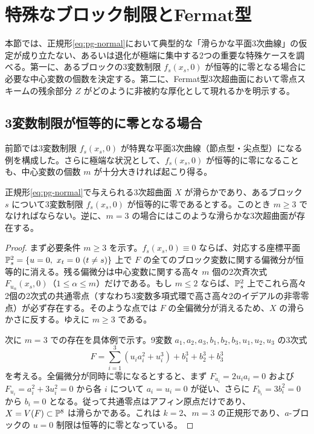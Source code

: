 \section{特殊なブロック制限とFermat型}\label{sec:pg-special}

本節では、正規形\eqref{eq:pg-normal}において典型的な「滑らかな平面3次曲線」の仮定が成り立たない、あるいは退化が極端に集中する2つの重要な特殊ケースを調べる。第一に、あるブロックの3変数制限 $f_s(x_s,0)$ が恒等的に零となる場合に必要な中心変数の個数を決定する。第二に、Fermat型3次超曲面において零点スキームの残余部分 $Z$ がどのように非被約な厚化として現れるかを明示する。

\subsection{3変数制限が恒等的に零となる場合}
前節では3変数制限 $f_s(x_s,0)$ が特異な平面3次曲線（節点型・尖点型）になる例を構成した。さらに極端な状況として、$f_s(x_s,0)$ が恒等的に零になることも、中心変数の個数 $m$ が十分大きければ起こり得る。

\begin{proposition}\label{prop:pg-zero-restriction}
正規形\eqref{eq:pg-normal}で与えられる3次超曲面 $X$ が滑らかであり、あるブロック $s$ について3変数制限 $f_s(x_s,0)$ が恒等的に零であるとする。このとき $m\geq3$ でなければならない。逆に、$m=3$ の場合にはこのような滑らかな3次超曲面が存在する。
\end{proposition}
\begin{proof}
まず必要条件 $m\geq3$ を示す。$f_s(x_s,0)\equiv 0$ ならば、対応する座標平面 $\PP_s^2=\{u=0,\ x_t=0\ (t\neq s)\}$ 上で $F$ の全てのブロック変数に関する偏微分が恒等的に消える。残る偏微分は中心変数に関する高々 $m$ 個の2次斉次式 $F_{u_\alpha}(x_s,0)$（$1\le\alpha\le m$）だけである。もし $m\leq2$ ならば、$\mathbb P_s^2$ 上でこれら高々2個の2次式の共通零点（すなわち3変数多項式環で高さ高々2のイデアルの非零零点）が必ず存在する。そのような点では $F$ の全偏微分が消えるため、$X$ の滑らかさに反する。ゆえに $m\geq3$ である。

次に $m=3$ での存在を具体例で示す。9変数 $a_1,a_2,a_3,b_1,b_2,b_3,u_1,u_2,u_3$ の3次式
\begin{equation}\label{eq:pg-zero-restriction-example}
F=\sum_{i=1}^3(u_i a_i^2+u_i^3)+b_1^3+b_2^3+b_3^3
\end{equation}
を考える。全偏微分が同時に零になるとすると、まず $F_{a_i}=2u_ia_i=0$ および $F_{u_i}=a_i^2+3u_i^2=0$ から各 $i$ について $a_i=u_i=0$ が従い、さらに $F_{b_i}=3b_i^2=0$ から $b_i=0$ となる。従って共通零点はアフィン原点だけであり、$X=V(F)\subset\mathbb P^8$ は滑らかである。これは $k=2$、$m=3$ の正規形であり、$a$-ブロックの $u=0$ 制限は恒等的に零となっている。
\end{proof}

